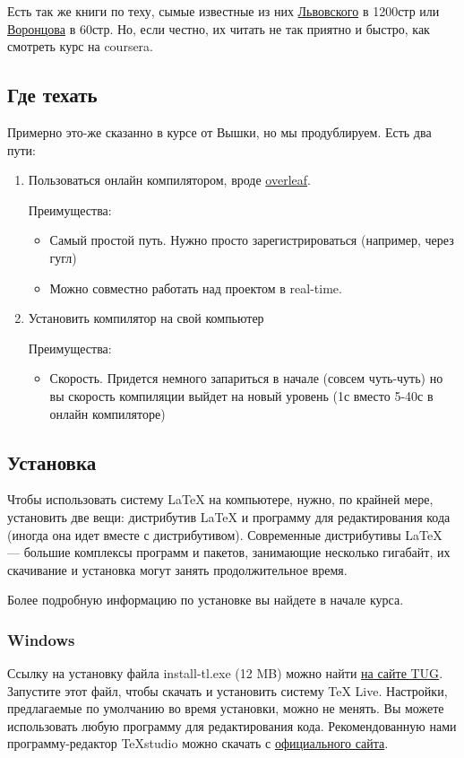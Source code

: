 Есть так же книги по теху, сымые известные из них \href{https://drive.google.com/file/d/1m3SDxmCL_f_X4J-IM2F_Wde0ez6ke0bx/view?usp=sharing}{Львовского} в 1200стр или \href{https://drive.google.com/file/d/140a3M7XQWOEBac07WjqbXdJ3xjHzieGM/view?usp=sharing}{Воронцова} в 60стр. Но, если честно, их читать не так приятно и быстро, как смотреть курс на coursera.

\subsection{Где техать}
Примерно это-же сказанно в курсе от Вышки, но мы продублируем.
Есть два пути:
\begin{enumerate}
    \item Пользоваться онлайн компилятором, вроде \href{https://www.overleaf.com/}{overleaf}.
    
    Преимущества: 
    \begin{itemize}
        \item Самый простой путь. Нужно просто зарегистрироваться (например, через гугл) 
        
        \item Можно совместно работать над проектом в real-time.
    \end{itemize}
    \item Установить компилятор на свой компьютер 
    
    Преимущества: 
    \begin{itemize}
        \item Скорость. Придется немного запариться в начале (совсем чуть-чуть) но вы скорость компиляции выйдет на новый уровень (1с вместо 5-40с в онлайн компиляторе) 
    \end{itemize}
\end{enumerate}

\subsection{Установка}
Чтобы использовать систему LaTeX на компьютере, нужно, по крайней мере, установить две вещи: дистрибутив LaTeX и программу для редактирования кода (иногда она идет вместе с дистрибутивом).
Современные дистрибутивы LaTeX — большие комплексы программ и пакетов, занимающие несколько гигабайт, их скачивание и установка могут занять продолжительное время.


Более подробную информацию по установке вы найдете в начале курса.

\subsubsection{Windows}
Ссылку на установку файла install-tl.exe (12 MB) можно найти \href{http://www.tug.org/texlive/acquire-netinstall.html}{на сайте TUG}. 
Запустите этот файл, чтобы скачать и установить систему TeX Live. 
Настройки, предлагаемые по умолчанию во время установки, можно не менять. 
Вы можете использовать любую программу для редактирования кода. 
Рекомендованную нами программу-редактор TeXstudio можно скачать с \href{http://texstudio.sourceforge.net/#download}{официального сайта}.

